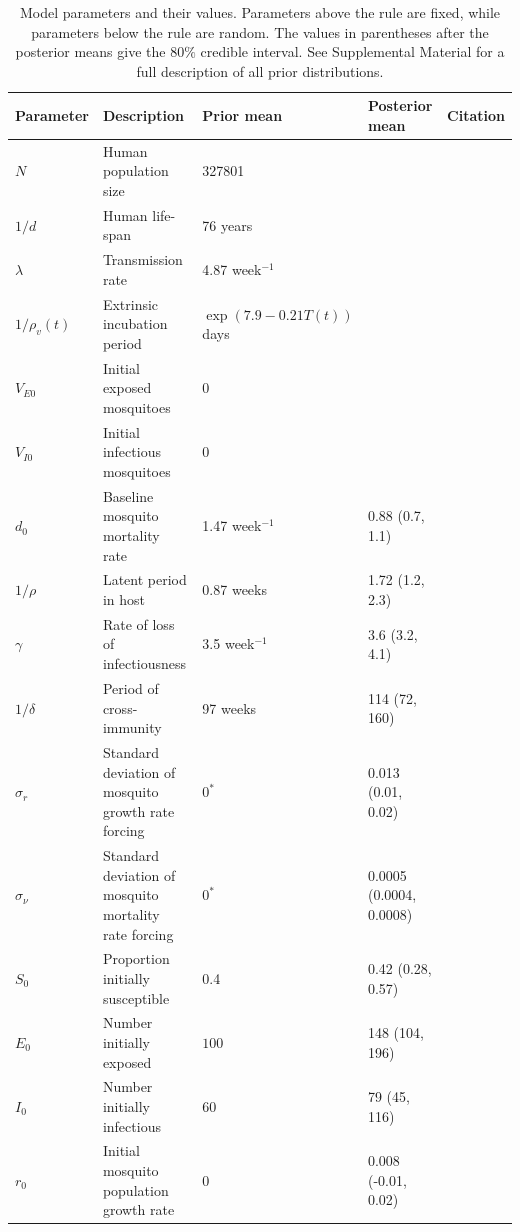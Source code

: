\documentclass[10pt,letterpaper]{article}
\begin{document}
\begin{table}[!ht]
\label{parameters}
\begin{adjustwidth}{-2.25in}{0in} 
\begin{center}
\caption{Model parameters and their values.  Parameters above the rule are fixed, while parameters below the rule are random.  The values in parentheses after the posterior means give the 80$\%$ credible interval. See Supplemental Material for a full description of all prior distributions.}
\begin{tabular}{lp{6cm}lll}
Parameter & Description & Prior mean & Posterior mean & Citation\\
\hline
$N$ & Human population size & 327801 & & \cite{vitpop} \\
$1/d$ & Human life-span & 76 years & &\cite{vitlong} \\
$\lambda$ & Transmission rate & 4.87 week$^{-1}$ & & \cite{Scott2000}\\
$1/\rho_{v}(t)$ & Extrinsic incubation period & $\exp\left(7.9 - 0.21 T(t) \right)$ days & & \cite{Chan2012}\\
$V_{E0}$ & Initial exposed mosquitoes &  0 & &\\
$V_{I0}$ & Initial infectious mosquitoes & 0 & &\\
\hline
$d_0$ & Baseline mosquito mortality rate & 1.47 week$^{-1}$ & 0.88 (0.7, 1.1) &  \cite{Brady2013} \\
$1/\rho$ & Latent period in host & 0.87 weeks  & 1.72 (1.2, 2.3) &  \cite{Chan2012}\\
$\gamma$ & Rate of loss of infectiousness & 3.5 week$^{-1}$ & 3.6 (3.2, 4.1) & \cite{Nguyet2013}\\
$1/\delta$ & Period of cross-immunity & 97 weeks &  114 (72, 160) & \cite{Reich2013}\\
$\sigma_r$ & Standard deviation of mosquito growth rate forcing & $0^*$ & 0.013 (0.01, 0.02) &\\
$\sigma_{\nu}$ & Standard deviation of mosquito mortality rate forcing & $0^*$ & 0.0005 (0.0004, 0.0008) & \\
$S_0$ & Proportion initially susceptible & 0.4 & 0.42 (0.28, 0.57)& \cite{Cardoso2011a} \\
$E_0$ & Number initially exposed & $100$ & 148 (104, 196) & \\
$I_0$ & Number initially infectious & $60$ & 79 (45, 116) &\\
$r_0$ & Initial mosquito population growth rate & 0 & 0.008 (-0.01, 0.02) &\\

\end{tabular}
\end{center}
\end{adjustwidth}
\end{table}
\end{document}
